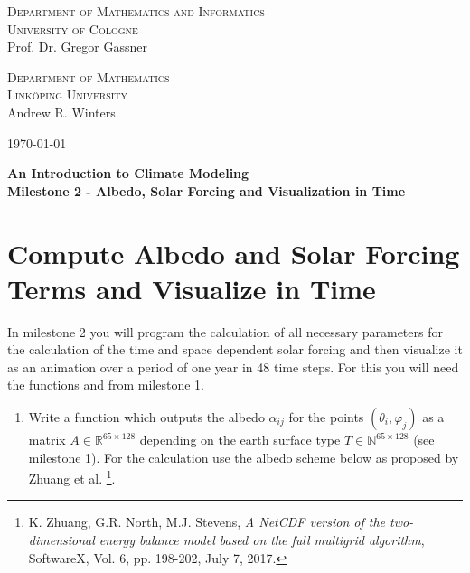 \documentclass[10pt]{scrartcl}
\newcommand{\lat}{\theta}
\begin{document}
\begin{minipage}{.5\textwidth}
{\scshape Department of Mathematics and Informatics \\
University of Cologne\\}
\small Prof. Dr. Gregor Gassner \\
\end{minipage}
\begin{minipage}{.3\textwidth}
{\scshape Department of Mathematics \\
Link\"{o}ping University\\}
\small Andrew R. Winters \\
\end{minipage}
\hfill
\begin{minipage}{.15\textwidth}
\begin{flushright}
\today
\end{flushright}
\end{minipage}

\begin{center}
{\Large\bfseries
An Introduction to Climate Modeling}\\
\vspace{0.2cm}
{\bfseries Milestone 2 - Albedo, Solar Forcing and Visualization in Time}
\end{center}


\section{Compute Albedo and Solar Forcing Terms and Visualize in Time}

In milestone 2 you will program the calculation of all necessary parameters for the calculation of the time and space dependent solar forcing and then visualize it as an animation over a period of one year in 48 time steps. For this you will need the functions \small\texttt{} \normalsize and \small\texttt{} \normalsize from milestone 1.

\begin{enumerate}
\item Write a function \small\texttt{} \normalsize which outputs the albedo $\alpha_{ij}$ for the points $\left(\lat_i,\varphi_j\right)$ as a matrix $A \in \mathbb{R}^{65\times 128}$ depending on the earth surface type $T\in \mathbb{N}^{65\times 128}$ (see milestone 1). For the calculation use the albedo scheme below as proposed by Zhuang et al. \footnote{K. Zhuang, G.R. North, M.J. Stevens, {\em A NetCDF version of the two-dimensional energy balance model based on the full multigrid algorithm}, SoftwareX, Vol. 6, pp. 198-202, July 7, 2017.}.
\end{enumerate}
\end{document}
